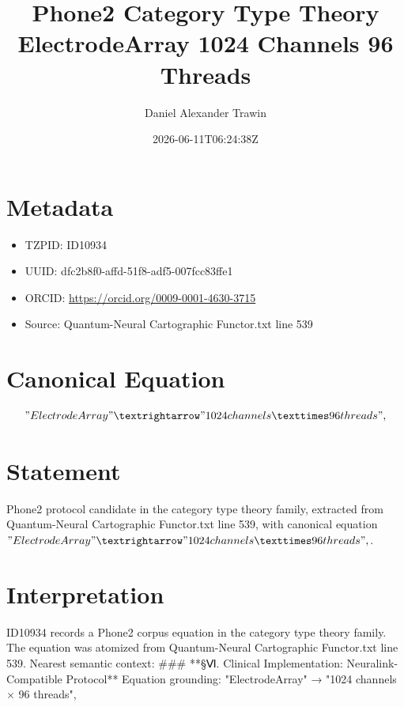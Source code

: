 \documentclass[11pt]{article}
\title{Phone2 Category Type Theory ElectrodeArray 1024 Channels 96 Threads}
\author{Daniel Alexander Trawin}
\date{2026-06-11T06:24:38Z}
\begin{document}
\maketitle
\section*{Metadata}
\begin{itemize}
\item TZPID: ID10934
\item UUID: dfc2b8f0-affd-51f8-adf5-007fcc83ffe1
\item ORCID: \url{https://orcid.org/0009-0001-4630-3715}
\item Source: Quantum-Neural Cartographic Functor.txt line 539
\end{itemize}
\section*{Canonical Equation}
\[
"ElectrodeArray" → "1024 channels × 96 threads",
\]
\section*{Statement}
Phone2 protocol candidate in the category type theory family, extracted from Quantum-Neural Cartographic Functor.txt line 539, with canonical equation $"ElectrodeArray" → "1024 channels × 96 threads",$.
\section*{Interpretation}
ID10934 records a Phone2 corpus equation in the category type theory family. The equation was atomized from Quantum-Neural Cartographic Functor.txt line 539. Nearest semantic context: ### **§Ⅵ. Clinical Implementation: Neuralink-Compatible Protocol** Equation grounding: "ElectrodeArray" → "1024 channels × 96 threads",
\end{document}
